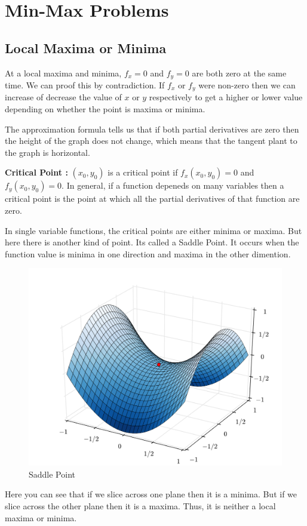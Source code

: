 

\chapter{Min-Max Problems}

\bigbreak
\section{Local Maxima or Minima}

At a local maxima and minima, $f_x = 0$ and $f_y = 0$ are both zero at the same time.
We can proof this by contradiction. 
If $f_x$ or $f_y$ were non-zero then we can increase of decrease the value of $x$ or $y$ respectively
to get a higher or lower value depending on whether the point is maxima or minima.

The approximation formula tells us that if both partial derivatives are zero then the height of the graph does not change, 
which means that the tangent plant to the graph is horizontal.

{\bf Critical Point : } $(x_0, y_0)$ is a critical point if $f_x(x_0, y_0) = 0$ and $f_y(x_0, y_0) = 0$.
In general, if a function depeneds on many variables then a critical point is the point at which all the partial derivatives of that function are zero.

In single variable functions, the critical points are either minima or maxima.
But here there is another kind of point. Its called a Saddle Point. 
It occurs when the function value is minima in one direction and maxima in the other dimention.

\begin{figure}[ht!]
    \centering
    \includegraphics[scale=0.25]{./images/lecture_4_figure_1.png}
    \caption{Saddle Point}
\end{figure}

Here you can see that if we slice across one plane then it is a minima.
But if we slice across the other plane then it is a maxima. 
Thus, it is neither a local maxima or minima.
